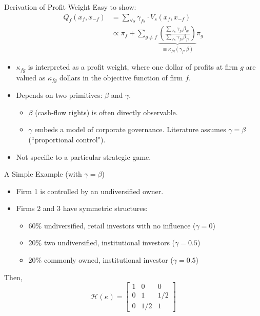 \begin{frame}{Derivation of Profit Weight}
\small
Easy to show:
\begin{align*}
Q_{f}\left(x_{f}, x_{-f}\right) &=\sum_{\forall s} \gamma_{f s} \cdot V_{s}\left(x_{f}, x_{-f}\right)\\
&\propto \pi_{f}+\sum_{g \neq f} \underbrace{\left(\frac{\sum_{\forall s} \gamma_{f s} \beta_{g s}}{\sum_{\forall s} \gamma_{f s} \beta_{f s}}\right)}_{\equiv \kappa_{f g}\left(\gamma_{f}, \beta\right)} \pi_{g}
\end{align*}
\begin{itemize}
    \item $\kappa_{fg}$ is interpreted as a \alert{profit weight}, where one dollar of profits at firm $g$ are valued as $\kappa_{fg}$ dollars in the objective function of firm $f$.
    \item Depends on two primitives: $\beta$ and $\gamma$.
\begin{itemize}
    \item $\beta$ (cash-flow rights) is often directly observable.
    \item $\gamma$ embeds a model of corporate governance. Literature assumes $\gamma = \beta$ (``proportional control").
\end{itemize}
\item Not specific to a particular strategic game.
\end{itemize}
\end{frame}

\begin{frame}[plain,label=simpleexample]{A Simple Example (with $\gamma = \beta$)}
\begin{itemize}
\item Firm 1 is controlled by an undiversified owner.
\item Firms 2 and 3 have symmetric structures:
\begin{itemize}
\item 60\% undiversified, retail investors with no influence ($\gamma = 0$)
\item 20\% two undiversified, institutional investors  ($\gamma = 0.5$)
\item 20\% commonly owned, institutional investor  ($\gamma = 0.5$)
\end{itemize}
\end{itemize}
Then,
$$
 \mathcal{H}(\kappa)= \begin{bmatrix}1 & 0 & 0 \\ 0 & 1 & 1/2 \\ 0 & 1/2 & 1\end{bmatrix}  
$$

\end{frame}

